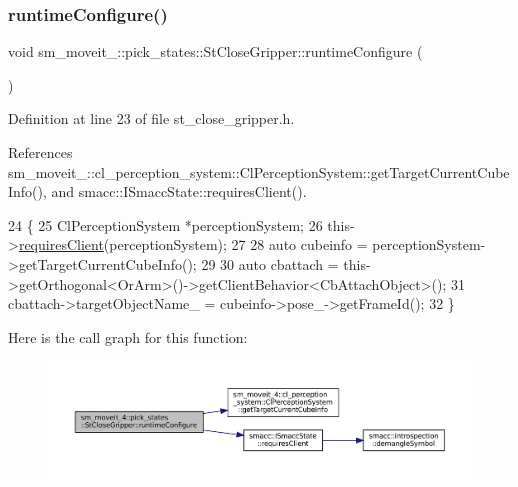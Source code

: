 \subsubsection{\texorpdfstring{runtime\+Configure()}{runtimeConfigure()}}
{\footnotesize\ttfamily void sm\+\_\+moveit\+\_\+::pick\+\_\+states\+::\+St\+Close\+Gripper\+::runtime\+Configure (\begin{DoxyParamCaption}{ }\end{DoxyParamCaption})\hspace{0.3cm}{\ttfamily [inline]}}



Definition at line 23 of file st\+\_\+close\+\_\+gripper.\+h.



References sm\+\_\+moveit\+\_\+::cl\+\_\+perception\+\_\+system\+::\+Cl\+Perception\+System\+::get\+Target\+Current\+Cube\+Info(), and smacc\+::\+I\+Smacc\+State\+::requires\+Client().


\begin{DoxyCode}
24          \{
25             ClPerceptionSystem *perceptionSystem;
26             this->\hyperlink{classsmacc_1_1ISmaccState_a7f95c9f0a6ea2d6f18d1aec0519de4ac}{requiresClient}(perceptionSystem);
27 
28             \textcolor{keyword}{auto} cubeinfo = perceptionSystem->getTargetCurrentCubeInfo();
29 
30             \textcolor{keyword}{auto} cbattach = this->getOrthogonal<OrArm>()->getClientBehavior<CbAttachObject>();
31             cbattach->targetObjectName\_ = cubeinfo->pose\_->getFrameId();
32          \}
\end{DoxyCode}
Here is the call graph for this function\+:
\nopagebreak
\begin{figure}[H]
\begin{center}
\leavevmode
\includegraphics[width=350pt]{structsm__moveit__4_1_1pick__states_1_1StCloseGripper_af3be0f07cd47254137be3f0eb049e90f_cgraph}
\end{center}
\end{figure}
\mbox{\label{structsm__moveit__4_1_1pick__states_1_1StCloseGripper_a5076328fb91d79beac4b1910aee86b05}} 
